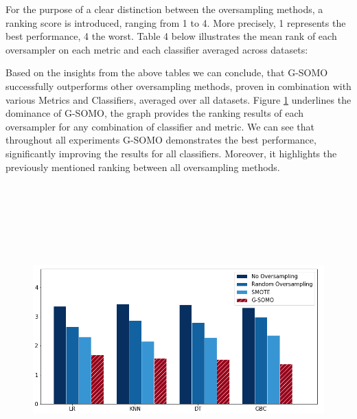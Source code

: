 \documentclass[parskip=full]{scrartcl}
\begin{document}
For the purpose of a clear distinction between the oversampling methods, a
ranking score is introduced, ranging from 1 to 4. More precisely, 1 represents
the best performance, 4 the worst. Table 4 below illustrates the mean rank of
each oversampler on each metric and each classifier averaged across datasets: 


Based on the insights from the above tables we can conclude, that G-SOMO
successfully outperforms other oversampling methods, proven in combination with
various Metrics and Classifiers, averaged over all datasets. Figure
\ref{fig:MeanRanking} underlines the dominance of G-SOMO, the graph provides the
ranking results of each oversampler for any combination of classifier and
metric. We can see that throughout all experiments G-SOMO demonstrates the best
performance, significantly improving the results for all classifiers. Moreover,
it highlights the previously mentioned ranking between all oversampling methods.


\begin{figure}[H]
	\centering
	\includegraphics[width=15cm,height=12cm, keepaspectratio]{../analysis/fig7.png}
	\label{fig:MeanRanking}
\end{figure}
\end{document}
